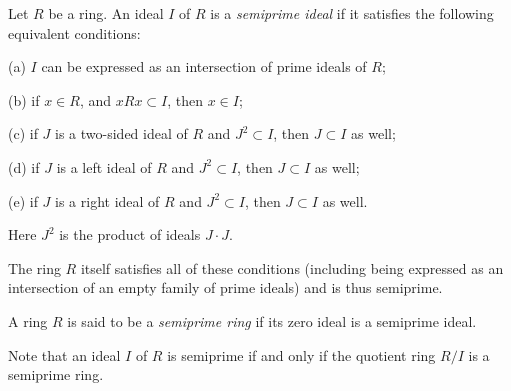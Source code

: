 \documentclass[12pt]{article}
\begin{document}
Let $R$ be a ring.  
An ideal $I$ of $R$ is a {\it semiprime ideal} 
if it satisfies the following equivalent conditions:

(a) $I$ can be expressed as an intersection of prime ideals of $R$;

(b) if $x \in R$, and $xRx \subset I$, then $x \in I$;

(c) if $J$ is a two-sided ideal of $R$ and $J^2 \subset I$, then $J \subset I$ as well;

(d) if $J$ is a left ideal of $R$ and $J^2 \subset I$, then $J \subset I$ as well;

(e) if $J$ is a right ideal of $R$ and $J^2 \subset I$, then $J \subset I$ as well.

Here $J^2$ is the product of ideals $J \cdot J$.

The ring $R$ itself satisfies all of these conditions (including being expressed as an intersection of an empty family of prime ideals) and is thus semiprime.

A ring $R$ is said to be a {\it semiprime ring} if its zero ideal is a semiprime ideal.

Note that an ideal $I$ of $R$ is semiprime if and only if the quotient ring $R/I$ is a semiprime ring.
\end{document}
